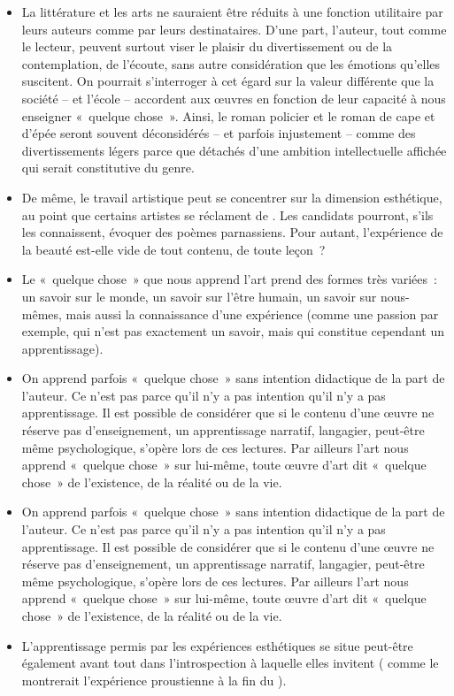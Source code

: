 {\begin{itemize}
\item La littérature et les arts ne sauraient être réduits à une fonction utilitaire par
leurs auteurs comme par leurs destinataires. D'une part, l'auteur, tout comme le
lecteur, peuvent surtout viser le plaisir du divertissement ou de la contemplation, de
l'écoute, sans autre considération que les émotions qu'elles suscitent. On pourrait
s'interroger à cet égard sur la valeur différente que la société – et l'école – accordent
aux œuvres en fonction de leur capacité à nous enseigner «~quelque chose~». Ainsi,
le roman policier et le roman de cape et d'épée seront souvent déconsidérés – et
parfois injustement – comme des divertissements légers parce que détachés d'une
ambition intellectuelle affichée qui serait constitutive du genre.

\item De même, le travail artistique peut se concentrer sur la dimension esthétique,
au point que certains artistes se réclament de . Les candidats
pourront, s'ils les connaissent, évoquer des poèmes parnassiens. Pour autant,
l'expérience de la beauté est-elle vide de tout contenu, de toute leçon~?

\item Le «~quelque chose~» que nous apprend l'art prend des formes très variées~:
un savoir sur le monde, un savoir sur l'être humain, un savoir sur nous-mêmes, mais
aussi la connaissance d'une expérience (comme une passion par exemple, qui n'est
pas exactement un savoir, mais qui constitue cependant un apprentissage).

\item On apprend parfois «~quelque chose~» sans intention didactique de la part de
l'auteur. Ce n'est pas parce qu'il n'y a pas intention qu'il n'y a pas apprentissage. Il est
possible de considérer que si le contenu d'une œuvre ne réserve pas d'enseignement,
un apprentissage narratif, langagier, peut-être même psychologique, s'opère lors de
ces lectures. Par ailleurs l'art nous apprend «~quelque chose~» sur lui-même, toute
œuvre d'art dit «~quelque chose~» de l'existence, de la réalité ou de la vie.

\item On apprend parfois «~quelque chose~» sans intention didactique de la part de
l'auteur. Ce n'est pas parce qu'il n'y a pas intention qu'il n'y a pas apprentissage. Il est
possible de considérer que si le contenu d'une œuvre ne réserve pas d'enseignement,
un apprentissage narratif, langagier, peut-être même psychologique, s'opère lors de
ces lectures. Par ailleurs l'art nous apprend «~quelque chose~» sur lui-même, toute
œuvre d'art dit «~quelque chose~» de l'existence, de la réalité ou de la vie.

\item L'apprentissage permis par les expériences esthétiques se situe peut-être
également avant tout dans l'introspection à laquelle elles invitent ( comme le montrerait
l'expérience proustienne à la fin du ).
\end{itemize}
}
\vfill{~}
